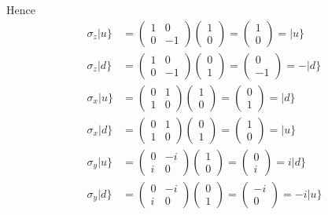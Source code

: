 Hence
\begin{align*}
\sigma_z|u\}&=\begin{pmatrix}1&0\\0&-1\end{pmatrix}\begin{pmatrix}1\\0\end{pmatrix}=\begin{pmatrix}1\\0\end{pmatrix}=|u\}
\\[1ex]
\sigma_z|d\}&=\begin{pmatrix}1&0\\0&-1\end{pmatrix}\begin{pmatrix}0\\1\end{pmatrix}=\begin{pmatrix}0\\-1\end{pmatrix}=-|d\}
\\[1ex]
\sigma_x|u\}&=\begin{pmatrix}0&1\\1&0\end{pmatrix}\begin{pmatrix}1\\0\end{pmatrix}=\begin{pmatrix}0\\1\end{pmatrix}=|d\}
\\[1ex]
\sigma_x|d\}&=\begin{pmatrix}0&1\\1&0\end{pmatrix}\begin{pmatrix}0\\1\end{pmatrix}=\begin{pmatrix}1\\0\end{pmatrix}=|u\}
\\[1ex]
\sigma_y|u\}&=\begin{pmatrix}0&-i\\i&0\end{pmatrix}\begin{pmatrix}1\\0\end{pmatrix}=\begin{pmatrix}0\\i\end{pmatrix}=i|d\}
\\[1ex]
\sigma_y|d\}&=\begin{pmatrix}0&-i\\i&0\end{pmatrix}\begin{pmatrix}0\\1\end{pmatrix}=\begin{pmatrix}-i\\0\end{pmatrix}=-i|u\}
\end{align*}

